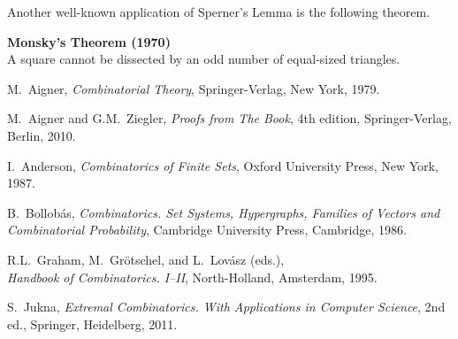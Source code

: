 \documentclass[a4paper]{article}
\newenvironment{thm}[1]{
	\begin{framed}
	\noindent
	{\bfseries #1}\\}{\setlength{\itemsep}{0pt}
	\end{framed}
}
\begin{document}
Another well-known application of Sperner's Lemma is the following theorem.

\begin{thm}{Monsky's Theorem (1970)}
	A square cannot be dissected by an odd number of equal-sized triangles.
\end{thm}



\begin{thebibliography}{9}

 M.~Aigner,
{\sl Combinatorial Theory}, Springer-Verlag, New York, 1979.

M.~Aigner and G.M.~Ziegler,
{\sl Proofs from The Book}, 4th edition, Springer-Verlag, Berlin, 2010.

 I.~Anderson,
{\sl Combinatorics of Finite Sets}, Oxford University Press, New York, 1987.


 B.~Bollob\'as,
{\sl Combinatorics. Set Systems, Hypergraphs, Families of Vectors and Combinatorial Probability},
Cambridge University Press, Cambridge, 1986.






 R.L.~Graham, M.~Gr\"otschel, and L.~Lov\'asz (eds.),\\
{\sl Handbook of Combinatorics. I--II}, North-Holland, Amsterdam, 1995.


 S.~Jukna,
{\sl Extremal Combinatorics. With Applications in Computer Science}, 2nd ed., Springer, Heidelberg, 2011.


\end{thebibliography}
\end{document}
